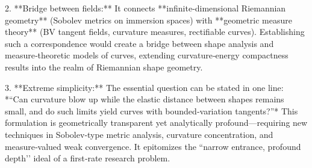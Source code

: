 2. **Bridge between fields:**  
   It connects **infinite‑dimensional Riemannian geometry** (Sobolev metrics on immersion spaces) with **geometric measure theory** (BV tangent fields, curvature measures, rectifiable curves). Establishing such a correspondence would create a bridge between shape analysis and measure‑theoretic models of curves, extending curvature‑energy compactness results into the realm of Riemannian shape geometry.

3. **Extreme simplicity:**  
   The essential question can be stated in one line:  
   *“Can curvature blow up while the elastic distance between shapes remains small, and do such limits yield curves with bounded‑variation tangents?”*  
   This formulation is geometrically transparent yet analytically profound—requiring new techniques in Sobolev‑type metric analysis, curvature concentration, and measure‑valued weak convergence. It epitomizes the “narrow entrance, profound depth’’ ideal of a first‑rate research problem.